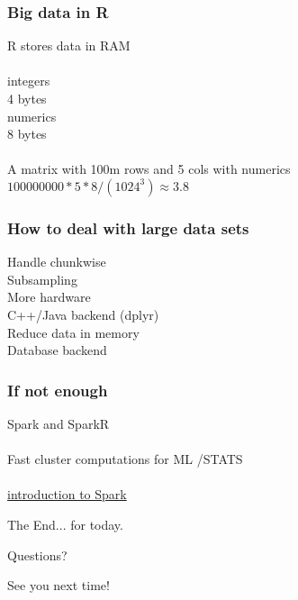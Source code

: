 \documentclass{beamer}
\begin{document}
\begin{frame}
	\frametitle{Big data in R}
	\begin{center}
		R stores data in RAM\\~\\
		integers\\
		4 bytes\\
		numerics\\
		8 bytes\\~\\
		A matrix with 100m rows and 5 cols with numerics \\
		$100000000 * 5 * 8 / (1024^3) \approx 3.8$
	\end{center}
\end{frame}

\begin{frame}
	\frametitle{How to deal with large data sets}
	\begin{center}
		Handle chunkwise\\
		Subsampling\\
		More hardware\\
		C++/Java backend (dplyr)\\
		Reduce data in memory\\
		Database backend\\
	\end{center}
\end{frame}

\begin{frame}
	\frametitle{If not enough}
	\begin{center}
		Spark and SparkR\\~\\
		Fast cluster computations  for ML /STATS\\~\\
		\href{https://www.youtube.com/watch?v=_Ss1Cm6WO-I}
		{introduction to Spark}	\\
	\end{center}
\end{frame}


\begin{frame}
\Huge{\centerline{The End... for today.}}
\Huge{\centerline{Questions?}}
\Huge{\centerline{See you next time!}}
\end{frame}

\end{document}
